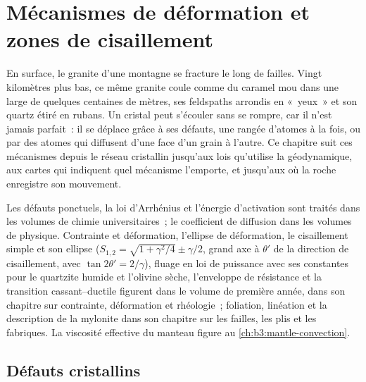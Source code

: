 \chapter{Mécanismes de déformation et zones de cisaillement}\label{ch:b3:deformation-mechanisms}

En surface, le granite d'une montagne se fracture le long de failles. Vingt
kilomètres plus bas, ce même granite coule comme du caramel mou dans une  large de quelques centaines de mètres, ses feldspaths arrondis en «~yeux~» et son quartz
étiré en rubans. Un cristal peut s'écouler sans se rompre, car il n'est jamais parfait~:
il se déplace grâce à ses défauts, une rangée d'atomes à la fois, ou par des atomes qui diffusent
d'une face d'un grain à l'autre. Ce chapitre suit ces mécanismes depuis le
réseau cristallin jusqu'aux lois qu'utilise la géodynamique, aux cartes qui indiquent quel
mécanisme l'emporte, et jusqu'aux  où la roche enregistre son mouvement.

\begin{recall}
Les défauts ponctuels, la loi d'Arrhénius et l'énergie d'activation sont traités dans les
volumes de chimie universitaires~; le coefficient de diffusion dans les
volumes de physique. Contrainte et déformation, l'ellipse de déformation, le cisaillement simple et son ellipse
($S_{1,2} = \sqrt{1 + \gamma^2/4} \pm \gamma/2$, grand axe à $\theta'$ de la
direction de cisaillement, avec $\tan2\theta' = 2/\gamma$), fluage en loi de puissance avec ses
constantes pour le quartzite humide et l'olivine sèche, l'enveloppe de résistance et la
transition cassant--ductile figurent dans le volume de première année, dans son chapitre sur
contrainte, déformation et rhéologie~; foliation, linéation et la description
de la mylonite dans son chapitre sur les failles, les plis et les fabriques. La
viscosité effective du manteau figure au \cref{ch:b3:mantle-convection}.
\end{recall}

\section{Défauts cristallins}

